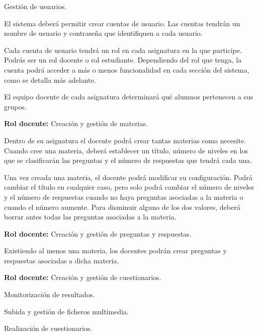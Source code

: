 \begin{rf0}

	\item Gestión de usuarios.
			\begin{rf0*}
				\item El sistema deberá permitir crear cuentas de usuario. Las cuentas tendrán un nombre de usuario y contraseña que identifiquen a cada usuario.
				\item Cada cuenta de usuario tendrá un rol en cada asignatura en la que participe. Podrás ser un rol docente o rol estudiante. Dependiendo del rol que tenga, la cuenta podrá acceder a más o menos funcionalidad en cada sección del sistema, como se detalla más adelante.
				\item El equipo docente de cada asignatura determinará qué alumnos pertenecen a sus grupos.
			\end{rf0*} 

	\item \textbf{Rol docente:} Creación y gestión de materias.
			\begin{rf0*}
				\item Dentro de su asignatura el docente podrá crear tantas materias como necesite. Cuando cree una materia, deberá establecer un título, número de niveles en los que se clasificarán las preguntas y el número de respuestas que tendrá cada una.
				\item Una vez creada una materia, el docente podrá modificar su configuración. Podrá cambiar el título en cualquier caso, pero solo podrá cambiar el número de niveles y el número de respuestas cuando no haya preguntas asociadas a la materia o cuando el número aumente. Para disminuir alguno de los dos valores, deberá borrar antes todas las preguntas asociadas a la materia.
			\end{rf0*}

	\item \textbf{Rol docente:} Creación y gestión de preguntas y respuestas.
		\begin{rf0*}
			\item Existiendo al menos una materia, los docentes podrán crear preguntas y respuestas asociadas a dicha materia.
		\end{rf0*}
	

	\item \textbf{Rol docente:} Creación y gestión de cuestionarios.
	\item Monitorización de resultados.
	\item Subida y gestión de ficheros multimedia.
	
	\item Realización de cuestionarios.
	


\end{rf0}



